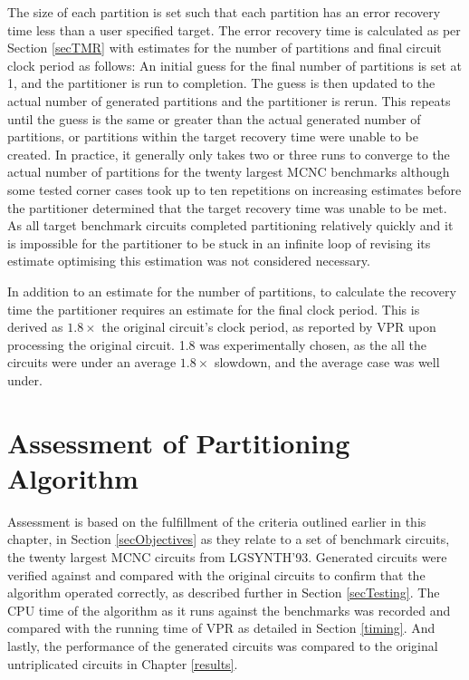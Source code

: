 \documentclass[12pt,final,oneside]{dwThesis} %
\begin{document}
    The size of each partition is set such that each partition has an error recovery time less than a user specified target.
    The error recovery time is calculated as per Section \ref{secTMR} with estimates for the number of partitions and final circuit clock period as follows:
    An initial guess for the final number of partitions is set at 1, and the partitioner is run to completion.
    The guess is then updated to the actual number of generated partitions and the partitioner is rerun. This repeats until the guess is the same or greater than the actual generated number of partitions, or partitions within the target recovery time were unable to be created.
    In practice, it generally only takes two or three runs to converge to the actual number of partitions for the twenty largest \gls{MCNC} benchmarks although some tested corner cases took up to ten repetitions on increasing estimates before the partitioner determined that the target recovery time was unable to be met.
    As all target benchmark circuits completed partitioning relatively quickly and it is impossible for the partitioner to be stuck in an infinite loop of revising its estimate optimising this estimation was not considered necessary.
    
    In addition to an estimate for the number of partitions, to calculate the recovery time the partitioner requires an estimate for the final clock period. This is derived as $1.8\times$ the original circuit's clock period, as reported by \gls{VPR} upon processing the original circuit. 1.8 was experimentally chosen, as the all the circuits were under an average $1.8\times$ slowdown, and the average case was well under.
    
   \section{Assessment of
      Partitioning Algorithm} Assessment is based on the fulfillment of
   the criteria outlined earlier in this chapter, in Section
   \ref{secObjectives} as they relate to a set of benchmark circuits, the
   twenty largest MCNC circuits from LGSYNTH'93.  Generated circuits were
   verified against and compared with the original circuits to confirm
   that the algorithm operated correctly, as described further in Section
   \ref{secTesting}.  The \gls{CPU} time of
   the algorithm as it runs against the benchmarks was recorded and
   compared with the running time of \gls{VPR} as detailed in Section
   \ref{timing}. And lastly, the
   performance of the generated circuits was compared to the original
   untriplicated circuits in Chapter \ref{results}.
\end{document}
